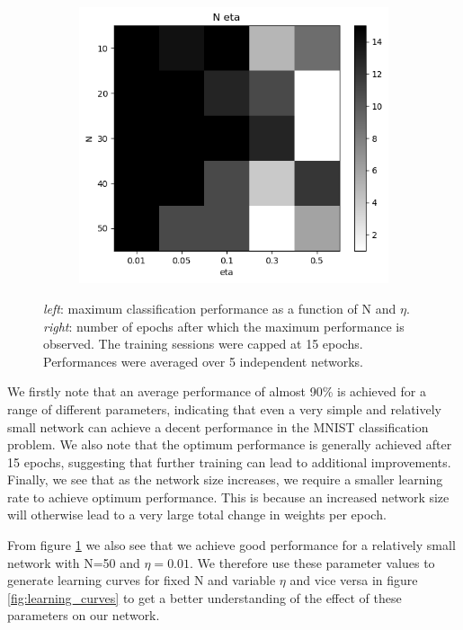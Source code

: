 \documentclass{article}
\begin{document}
\begin{figure}[h]
\begin{subfigure}[t]{0.42\linewidth}
		\includegraphics[width = 1.0\linewidth, trim={0 0 0 0}, clip=true]{figures/scan_N_eta_epochs.png}
	\end{subfigure}%
\caption{\textit{left}: maximum classification performance as a function of N and $\eta$. \textit{right}: number of epochs after which the maximum performance is observed. The training sessions were capped at 15 epochs. Performances were averaged over 5 independent networks.}
\label{fig:scan_N_eta}
\end{figure}

We firstly note that an average performance of almost 90\% is achieved for a range of different parameters, indicating that even a very simple and relatively small network can achieve a decent performance in the MNIST classification problem. We also note that the optimum performance is generally achieved after 15 epochs, suggesting that further training can lead to additional improvements. Finally, we see that as the network size increases, we require a smaller learning rate to achieve optimum performance. This is because an increased network size will otherwise lead to a very large total change in weights per epoch.

From figure \ref{fig:scan_N_eta} we also see that we achieve good performance for a relatively small network with N=50 and $\eta = 0.01$. We therefore use these parameter values to generate learning curves for fixed N and variable $\eta$ and vice versa in figure \ref{fig:learning_curves} to get a better understanding of the effect of these parameters on our network.
\end{document}
